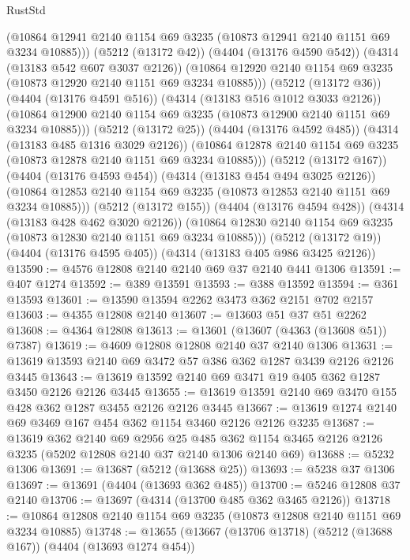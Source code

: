 \begin{lexlean}{RustStd}
\begin{coremodule}
                (@10864 @12941 @2140 @1154 @69 @3235 (@10873 @12941 @2140 @1151 @69 @3234 @10885)))
              (@5212 (@13172 @42))
              (@4404 (@13176 @4590 @542))
              (@4314 (@13183 @542 @607 @3037 @2126))
              (@10864 @12920 @2140 @1154 @69 @3235 (@10873 @12920 @2140 @1151 @69 @3234 @10885)))
            (@5212 (@13172 @36))
            (@4404 (@13176 @4591 @516))
            (@4314 (@13183 @516 @1012 @3033 @2126))
            (@10864 @12900 @2140 @1154 @69 @3235 (@10873 @12900 @2140 @1151 @69 @3234 @10885)))
          (@5212 (@13172 @25))
          (@4404 (@13176 @4592 @485))
          (@4314 (@13183 @485 @1316 @3029 @2126))
          (@10864 @12878 @2140 @1154 @69 @3235 (@10873 @12878 @2140 @1151 @69 @3234 @10885)))
        (@5212 (@13172 @167))
        (@4404 (@13176 @4593 @454))
        (@4314 (@13183 @454 @494 @3025 @2126))
        (@10864 @12853 @2140 @1154 @69 @3235 (@10873 @12853 @2140 @1151 @69 @3234 @10885)))
      (@5212 (@13172 @155))
      (@4404 (@13176 @4594 @428))
      (@4314 (@13183 @428 @462 @3020 @2126))
      (@10864 @12830 @2140 @1154 @69 @3235 (@10873 @12830 @2140 @1151 @69 @3234 @10885)))
    (@5212 (@13172 @19))
    (@4404 (@13176 @4595 @405))
    (@4314 (@13183 @405 @986 @3425 @2126))
@13590 := @4576 @12808 @2140 @2140 @69 @37 @2140 @441 @1306
@13591 := @407 @1274
@13592 := @389 @13591
@13593 := @388 @13592
@13594 := @361 @13593
@13601 := @13590 @13594 @2262 @3473 @362 @2151 @702 @2157
@13603 := @4355 @12808 @2140
@13607 := @13603 @51 @37 @51 @2262
@13608 := @4364 @12808
@13613 := @13601 (@13607 (@4363 (@13608 @51)) @7387)
@13619 := @4609 @12808 @12808 @2140 @37 @2140 @1306
@13631 := @13619 @13593 @2140 @69 @3472 @57 @386 @362 @1287 @3439 @2126 @2126 @3445
@13643 := @13619 @13592 @2140 @69 @3471 @19 @405 @362 @1287 @3450 @2126 @2126 @3445
@13655 := @13619 @13591 @2140 @69 @3470 @155 @428 @362 @1287 @3455 @2126 @2126 @3445
@13667 := @13619 @1274 @2140 @69 @3469 @167 @454 @362 @1154 @3460 @2126 @2126 @3235
@13687 := @13619
    @362
    @2140
    @69
    @2956
    @25
    @485
    @362
    @1154
    @3465
    @2126
    @2126
    @3235
    (@5202 @12808 @2140 @37 @2140 @1306 @2140 @69)
@13688 := @5232 @1306
@13691 := @13687 (@5212 (@13688 @25))
@13693 := @5238 @37 @1306
@13697 := @13691 (@4404 (@13693 @362 @485))
@13700 := @5246 @12808 @37 @2140
@13706 := @13697 (@4314 (@13700 @485 @362 @3465 @2126))
@13718 := @10864 @12808 @2140 @1154 @69 @3235 (@10873 @12808 @2140 @1151 @69 @3234 @10885)
@13748 := @13655
    (@13667
      (@13706 @13718)
      (@5212 (@13688 @167))
      (@4404 (@13693 @1274 @454))

\end{coremodule}
\end{lexlean}
